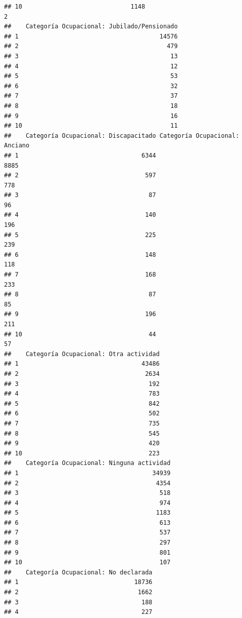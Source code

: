 \documentclass[11pt,]{article}
\begin{document}
\begin{verbatim}
## 10                              1148                               2
##    Categoría Ocupacional: Jubilado/Pensionado
## 1                                       14576
## 2                                         479
## 3                                          13
## 4                                          12
## 5                                          53
## 6                                          32
## 7                                          37
## 8                                          18
## 9                                          16
## 10                                         11
##    Categoría Ocupacional: Discapacitado Categoría Ocupacional: Anciano
## 1                                  6344                           8885
## 2                                   597                            778
## 3                                    87                             96
## 4                                   140                            196
## 5                                   225                            239
## 6                                   148                            118
## 7                                   168                            233
## 8                                    87                             85
## 9                                   196                            211
## 10                                   44                             57
##    Categoría Ocupacional: Otra actividad
## 1                                  43486
## 2                                   2634
## 3                                    192
## 4                                    783
## 5                                    842
## 6                                    502
## 7                                    735
## 8                                    545
## 9                                    420
## 10                                   223
##    Categoría Ocupacional: Ninguna actividad
## 1                                     34939
## 2                                      4354
## 3                                       518
## 4                                       974
## 5                                      1183
## 6                                       613
## 7                                       537
## 8                                       297
## 9                                       801
## 10                                      107
##    Categoría Ocupacional: No declarada
## 1                                18736
## 2                                 1662
## 3                                  188
## 4                                  227

\end{verbatim}
\end{document}
